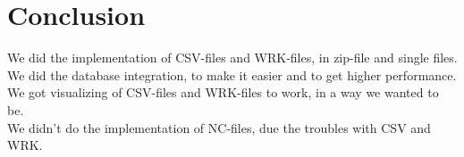 \chapter{Conclusion}
We did the implementation of CSV-files and WRK-files, in zip-file and single files.\\
We did the database integration, to make it easier and to get higher performance.\\
We got visualizing of CSV-files and WRK-files to work, in a way we wanted to be.\\
We didn't do the implementation of NC-files, due the troubles with CSV and WRK.\\
